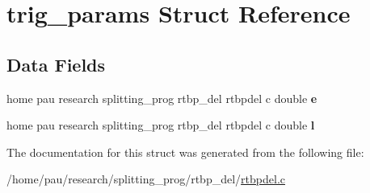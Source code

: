 \hypertarget{structtrig__params}{
\section{trig\_\-params Struct Reference}
\label{structtrig__params}
}
\subsection*{Data Fields}
\begin{DoxyCompactItemize}
\item 
\hypertarget{structtrig__params_a5592c5897c79cb89e61f759d4ff398d0}{
home pau research splitting\_\-prog rtbp\_\-del rtbpdel c double {\bfseries e}}
\label{structtrig__params_a5592c5897c79cb89e61f759d4ff398d0}

\item 
\hypertarget{structtrig__params_a3273b81d865e5211ca88c8bf0e7d1812}{
home pau research splitting\_\-prog rtbp\_\-del rtbpdel c double {\bfseries l}}
\label{structtrig__params_a3273b81d865e5211ca88c8bf0e7d1812}

\end{DoxyCompactItemize}


The documentation for this struct was generated from the following file:\begin{DoxyCompactItemize}
\item 
/home/pau/research/splitting\_\-prog/rtbp\_\-del/\hyperlink{rtbpdel_8c}{rtbpdel.c}\end{DoxyCompactItemize}
